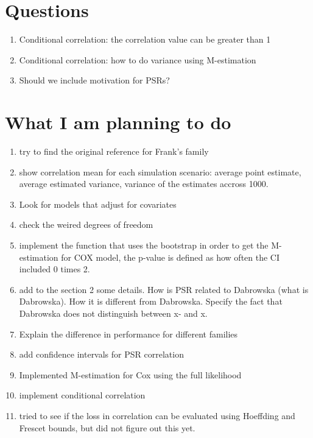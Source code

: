 \documentclass[]{article}
\begin{document}
\section{Questions}
\begin{enumerate}
  \item Conditional correlation: the correlation value can be greater than 1
  \item Conditional correlation: how to do variance using M-estimation
  \item Should we include motivation for PSRs?
\end{enumerate}

\section{What I am planning to do}
\begin{enumerate}
  \item try to find the original reference for Frank's family
  \item show correlation mean for each simulation scenario: average point estimate, average estimated variance, variance of the estimates accross 1000.
  \item Look for models that adjust for covariates
  \item check the weired degrees of freedom
  \item implement the function that uses the bootstrap in order to get the M-estimation for COX model, the p-value is defined as how often the CI included 0 times 2.
  \item add to the section 2 some details. How is PSR related to Dabrowska (what is Dabrowska). How it is different from Dabrowska. Specify the fact that Dabrowska does not distinguish between x- and x.
  \item Explain the difference in performance for different families
  \item add confidence intervals for PSR correlation
  \item Implemented M-estimation for Cox using the full likelihood
  \item implement conditional correlation
  \item tried to see if the loss in correlation can be evaluated using Hoeffding and Frescet bounds, but did not figure out this yet.
\end{enumerate}
\end{document}
